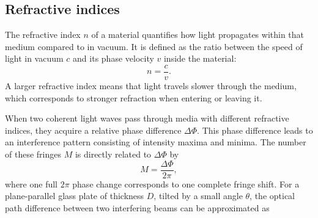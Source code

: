 \subsection{Refractive indices}
\label{sec:ind}
The refractive index $n$ of a material quantifies how light propagates within that medium compared to in vacuum. 
It is defined as the ratio between the speed of light in vacuum $c$ and its phase velocity $v$ inside the material:
\begin{equation}
    n = \frac{c}{v}.
    \label{eqn:n_def}
\end{equation}
A larger refractive index means that light travels slower through the medium, which corresponds to stronger refraction when entering or leaving it.

\medskip
\noindent
When two coherent light waves pass through media with different refractive indices, they acquire a relative phase difference $\Delta\Phi$. 
This phase difference leads to an interference pattern consisting of intensity maxima and minima.
The number of these fringes $M$ is directly related to $\Delta\Phi$ by
\begin{equation}
    M = \frac{\Delta\Phi}{2\pi},
    \label{eqn:m}
\end{equation}
where one full $2\pi$ phase change corresponds to one complete fringe shift.
\noindent
For a plane-parallel glass plate of thickness $D$, tilted by a small angle $\theta$, the optical path difference between two interfering beams can be approximated as

